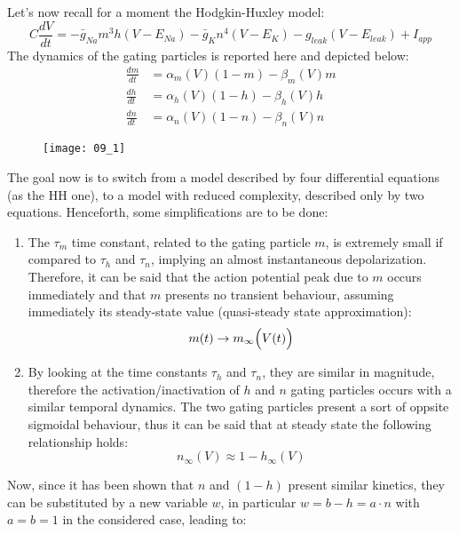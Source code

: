 Let's now recall for a moment the Hodgkin-Huxley model:
\begin{equation*}
    C\frac{dV}{dt}=-\bar{g}_{Na}m^{3}h(V-E_{Na})-\bar{g}_{K}n^{4}(V-E_{K})-g_{leak}(V-E_{leak})+I_{app}
\end{equation*}
The dynamics of the gating particles is reported here and depicted below:
\begin{align*}
    \frac{dm}{dt} & =\alpha_{m}(V)(1-m)-\beta_{m}(V)m \\
    \frac{dh}{dt} & =\alpha_{h}(V)(1-h)-\beta_{h}(V)h \\
    \frac{dn}{dt} & =\alpha_{n}(V)(1-n)-\beta_{n}(V)n
\end{align*}
\begin{figure}[H]
    \texttt{[image: 09\_1]}
    \centering
\end{figure}
The goal now is to switch from a model described by four differential equations (as the HH one), to
a model with reduced complexity, described only by two equations. Henceforth, some simplifications
are to be done:
\begin{enumerate}
    \item The \(\tau_{m}\) time constant, related to the gating particle \(m\), is extremely small if
          compared to \(\tau_{h}\) and \(\tau_{n}\), implying an almost instantaneous depolarization. Therefore,
          it can be said that the action potential peak due to \(m\) occurs immediately and that \(m\) presents
          no transient behaviour, assuming immediately its steady-state value (quasi-steady state approximation):
          \begin{equation*}
              m(t)\to{m_{\infty}\Bigl(V(t)\Bigr)}
          \end{equation*}
    \item By looking at the time constants \(\tau_{h}\) and \(\tau_{n}\), they are similar in magnitude,
          therefore the activation/inactivation of \(h\) and \(n\) gating particles occurs with a similar
          temporal dynamics. The two gating particles present a sort of oppsite sigmoidal behaviour, thus
          it can be said that at steady state the following relationship holds:
          \begin{equation*}
              n_{\infty}(V)\approx{1-h_{\infty}(V)}
          \end{equation*}
\end{enumerate}
Now, since it has been shown that \(n\) and \((1-h)\) present similar kinetics, they can be substituted by
a new variable \(w\), in particular \(w=b-h=a\cdot{n}\) with \(a=b=1\) in the considered case, leading to:
